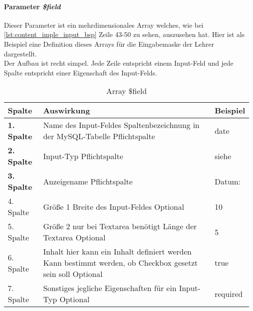 \paragraph{Parameter \textit{\$field}}
Dieser Parameter ist ein mehrdimensionales Array welches, wie bei \autoref{lst:content_imple_input_bsp} Zeile 43-50 zu sehen, auszusehen hat. Hier ist als Beispiel eine Definition dieses Arrays für die Eingabemaske der Lehrer dargestellt.\\
Der Aufbau ist recht simpel. Jede Zeile entspricht einem Input-Feld und jede Spalte entspricht einer Eigenschaft des Input-Felds.
\begin{table}[H]
\centering
\begin{tabular}{p{2 cm}p{8 cm}p{3 cm}}
   \toprule
   \textbf{Spalte} & \textbf{Auswirkung} & \textbf{Beispiel} \\
   \midrule
          \textbf{1. Spalte} & Name des Input-Feldes \newline Spaltenbezeichnung in der MySQL-Tabelle \newline Pflichtspalte & date  \\
          \hline
          \textbf{2. Spalte} & Input-Typ \newline Pflichtspalte & siehe \nameref{sec:content_imple_input_type}\\
          \hline
          \textbf{3. Spalte} & Anzeigename \newline Pflichtspalte & Datum:  \\
          \hline
          4. Spalte & Größe 1 \newline Breite des Input-Feldes \newline Optional & 10\\
          \hline
          5. Spalte & Größe 2 \newline nur bei Textarea benötigt \newline Länge der Textarea \newline Optional & 5\\
          \hline
          6. Spalte & Inhalt \newline hier kann ein Inhalt definiert werden \newline Kann bestimmt werden, ob Checkbox gesetzt sein soll \newline Optional & true\\
          \hline
          7. Spalte & Sonstiges \newline jegliche Eigenschaften für ein Input-Typ \newline Optional & required \\
   \bottomrule
\end{tabular}
\caption{Array \$field}
\end{table}
